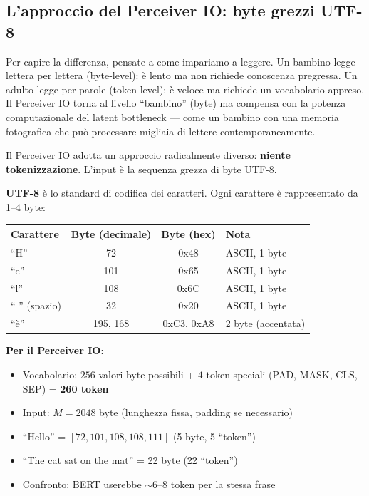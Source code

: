 \documentclass[12pt,a4paper]{article}
\begin{document}
\subsection{L'approccio del Perceiver IO: byte grezzi UTF-8}

Per capire la differenza, pensate a come impariamo a leggere. Un bambino legge lettera per lettera (byte-level): \`e lento ma non richiede conoscenza pregressa. Un adulto legge per parole (token-level): \`e veloce ma richiede un vocabolario appreso. Il Perceiver IO torna al livello ``bambino'' (byte) ma compensa con la potenza computazionale del latent bottleneck --- come un bambino con una memoria fotografica che pu\`o processare migliaia di lettere contemporaneamente.

Il Perceiver IO adotta un approccio radicalmente diverso: \textbf{niente tokenizzazione}. L'input \`e la sequenza grezza di byte UTF-8.

\begin{formulabox}
\textbf{UTF-8} \`e lo standard di codifica dei caratteri. Ogni carattere \`e rappresentato da 1--4 byte:

\begin{center}
\begin{tabular}{lccl}
\toprule
\textbf{Carattere} & \textbf{Byte (decimale)} & \textbf{Byte (hex)} & \textbf{Nota} \\
\midrule
``H'' & 72 & 0x48 & ASCII, 1 byte \\
``e'' & 101 & 0x65 & ASCII, 1 byte \\
``l'' & 108 & 0x6C & ASCII, 1 byte \\
`` '' (spazio) & 32 & 0x20 & ASCII, 1 byte \\
``\`e'' & 195, 168 & 0xC3, 0xA8 & 2 byte (accentata) \\
\bottomrule
\end{tabular}
\end{center}

\textbf{Per il Perceiver IO}:
\begin{itemize}
    \item Vocabolario: $256$ valori byte possibili + $4$ token speciali (PAD, MASK, CLS, SEP) = \textbf{260 token}
    \item Input: $M = 2048$ byte (lunghezza fissa, padding se necessario)
    \item ``Hello'' = $[72, 101, 108, 108, 111]$ (5 byte, 5 ``token'')
    \item ``The cat sat on the mat'' = 22 byte (22 ``token'')
    \item Confronto: BERT userebbe $\sim$6--8 token per la stessa frase
\end{itemize}
\end{formulabox}
\end{document}
